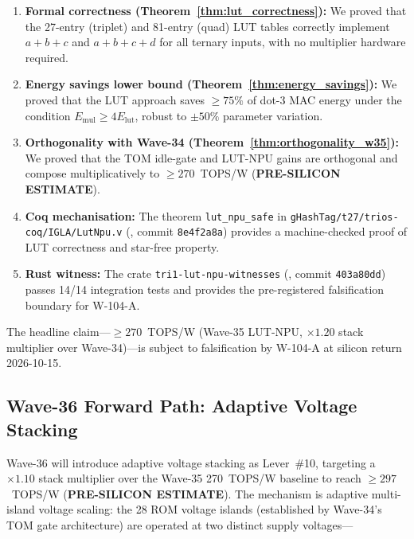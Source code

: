 \begin{enumerate}
  \item \textbf{Formal correctness (Theorem~\ref{thm:lut_correctness}):}
    We proved that the 27-entry (triplet) and 81-entry (quad) LUT tables
    correctly implement $a+b+c$ and $a+b+c+d$ for all ternary inputs,
    with no multiplier hardware required.

  \item \textbf{Energy savings lower bound (Theorem~\ref{thm:energy_savings}):}
    We proved that the LUT approach saves $\geq 75\%$ of dot-3 MAC energy
    under the condition $E_{\mathrm{mul}} \geq 4 E_{\mathrm{lut}}$, robust
    to $\pm 50\%$ parameter variation.

  \item \textbf{Orthogonality with Wave-34 (Theorem~\ref{thm:orthogonality_w35}):}
    We proved that the TOM idle-gate and LUT-NPU gains are orthogonal and
    compose multiplicatively to $\geq 270$~TOPS/W (\textbf{PRE-SILICON ESTIMATE}).

  \item \textbf{Coq mechanisation:}  The theorem \texttt{lut\_npu\_safe}
    in \texttt{gHashTag/t27/trios-coq/IGLA/LutNpu.v} (\cite{coq_lut_npu_t27_651},
    commit \texttt{8e4f2a8a}) provides a machine-checked proof of LUT correctness
    and star-free property.

  \item \textbf{Rust witness:}  The crate \texttt{tri1-lut-npu-witnesses}
    (\cite{rust_witness_w104a_max_true_21}, commit \texttt{403a80dd}) passes
    14/14 integration tests and provides the pre-registered falsification
    boundary for W-104-A.
\end{enumerate}

The headline claim---$\geq 270$~TOPS/W (Wave-35 LUT-NPU, $\times 1.20$ stack
multiplier over Wave-34)---is subject to falsification by W-104-A at silicon
return 2026-10-15.

\subsection{Wave-36 Forward Path: Adaptive Voltage Stacking}

Wave-36 will introduce adaptive voltage stacking as Lever~\#10, targeting
a $\times 1.10$ stack multiplier over the Wave-35 270~TOPS/W baseline to
reach $\geq 297$~TOPS/W (\textbf{PRE-SILICON ESTIMATE}).  The mechanism is
adaptive multi-island voltage scaling: the 28 ROM voltage islands (established
by Wave-34's TOM gate architecture) are operated at two distinct supply voltages---

